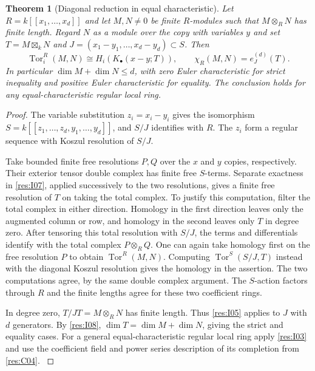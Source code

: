 \documentclass[11pt,oneside,openany]{book}
\newtheorem{theorem}{Theorem}[chapter]
\theoremstyle{definition}
\theoremstyle{remark}
\begin{document}
\begin{theorem}[Diagonal reduction in equal characteristic]\label{res:I09}
Let \(R=k[[x_1,\ldots,x_d]]\) and let \(M,N\ne0\) be finite
\(R\)-modules such that \(M\otimes_R N\) has finite length. Regard
\(N\) as a module over the copy with variables \(y\) and set
\(T=M\boxtimes_k N\) and \(J=(x_1-y_1,\ldots,x_d-y_d)\subset S\).
Then
\[
 \operatorname{Tor}_i^R(M,N)\cong H_i(K_\bullet(x-y;T)),\qquad
 \chi_R(M,N)=e^{(d)}_J(T).
\]
In particular \(\dim M+\dim N\le d\), with zero Euler
characteristic for strict inequality and positive Euler
characteristic for equality. The conclusion holds for any
equal-characteristic regular local ring.
\end{theorem}
\begin{proof}
The variable substitution \(z_i=x_i-y_i\) gives the isomorphism
\(S=k[[z_1,\ldots,z_d,y_1,\ldots,y_d]]\), and \(S/J\) identifies
with \(R\). The \(z_i\) form a regular sequence with Koszul
resolution of \(S/J\).

Take bounded finite free resolutions \(P,Q\) over the \(x\) and
\(y\) copies, respectively. Their exterior tensor double complex
has finite free \(S\)-terms. Separate exactness in
\ref{res:I07}, applied successively to the two resolutions, gives
a finite free resolution of \(T\) on taking the total complex.
To justify this computation, filter the total complex in either
direction. Homology in the first direction leaves only the
augmented column or row, and homology in the second leaves only
\(T\) in degree zero. After tensoring this total resolution with
\(S/J\), the terms and differentials identify with the total
complex \(P\otimes_R Q\). One can again take homology first on the
free resolution \(P\) to obtain \(\operatorname{Tor}^R(M,N)\).
Computing \(\operatorname{Tor}^S(S/J,T)\) instead with the
diagonal Koszul resolution gives the homology in the assertion.
The two computations agree, by the same double complex argument.
The \(S\)-action factors through \(R\) and the finite lengths
agree for these two coefficient rings.

In degree zero,
\(T/JT=M\otimes_R N\) has finite length. Thus \ref{res:I05}
applies to \(J\) with \(d\) generators. By \ref{res:I08},
\(\dim T=\dim M+\dim N\), giving the strict and equality cases.
For a general equal-characteristic regular local ring apply
\ref{res:I03} and use the coefficient field and power series
description of its completion from \ref{res:C04}.
\cite[Chapter V, \S B.3, Theorem 1]{serre-local}
\end{proof}
\end{document}
